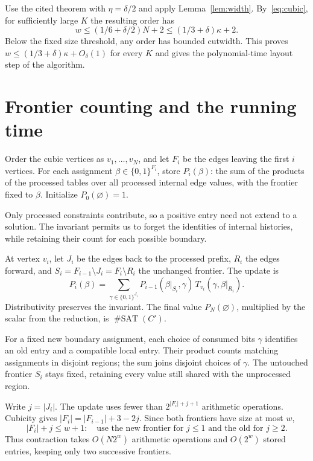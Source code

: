 \documentclass[11pt]{article}
\newcommand{\B}{\{0,1\}}
\newcommand{\satcount}{\operatorname{\#SAT}}
\begin{document}
Use the cited theorem with $\eta=\delta/2$ and apply
Lemma~\ref{lem:width}. By~\eqref{eq:cubic}, for sufficiently large
$K$ the resulting order has
\[
 w\le(1/6+\delta/2)N+2
   \le(1/3+\delta)\kappa+2.
\]
Below the fixed size threshold, any order has bounded cutwidth.
This proves $w\le(1/3+\delta)\kappa+O_\delta(1)$ for every $K$
and gives the polynomial-time layout step of the algorithm.

\section{Frontier counting and the running time}

Order the cubic vertices as $v_1,\ldots,v_N$, and let $F_i$ be the
edges leaving the first $i$ vertices. For each assignment
$\beta\in\B^{F_i}$, store $P_i(\beta)$: the sum of the products
of the processed tables over all processed internal edge values,
with the frontier fixed to $\beta$. Initialize $P_0(\varnothing)=1$.

Only processed
constraints contribute, so a positive entry need not extend to a
solution. The invariant permits us to forget the identities of internal
histories, while retaining their count for each possible boundary.

At vertex $v_i$, let $J_i$ be the edges back to the processed
prefix, $R_i$ the edges forward, and
$S_i=F_{i-1}\setminus J_i=F_i\setminus R_i$ the unchanged frontier.
The update is
\begin{equation}\label{eq:update}
 P_i(\beta)=\sum_{\gamma\in\B^{J_i}}
 P_{i-1}(\beta|_{S_i},\gamma)\,
 T_{v_i}(\gamma,\beta|_{R_i}).
\end{equation}
Distributivity preserves the invariant. The final value
$P_N(\varnothing)$, multiplied by the scalar from the reduction,
is $\satcount(C')$.

For a fixed new boundary assignment, each choice of consumed bits
$\gamma$ identifies an old entry and a compatible local entry.
Their product counts matching assignments in disjoint regions; the
sum joins disjoint choices of $\gamma$. The untouched frontier $S_i$
stays fixed, retaining every value still shared with the unprocessed
region.

Write $j=|J_i|$. The update uses fewer than
$2^{|F_i|+j+1}$ arithmetic operations. Cubicity gives
$|F_i|=|F_{i-1}|+3-2j$. Since both frontiers have size at most $w$,
\[
 |F_i|+j\le w+1:
 \quad\text{use the new frontier for $j\le1$ and the old for $j\ge2$.}
\]
Thus contraction takes $O(N2^w)$ arithmetic operations and
$O(2^w)$ stored entries, keeping only two successive frontiers.
\end{document}
